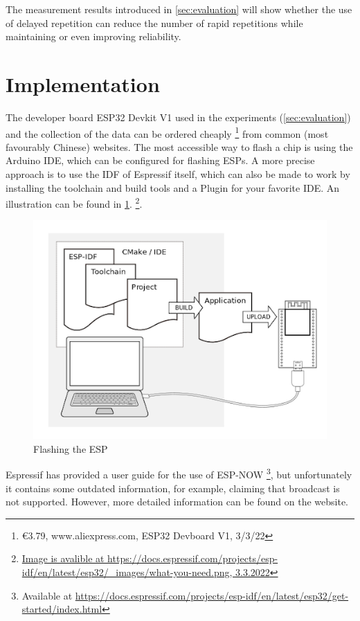 The measurement results introduced in \cref{sec:evaluation} will show whether the use of delayed repetition 
can reduce the number of rapid repetitions while maintaining or even improving reliability.

\section{Implementation}

The developer board ESP32 Devkit V1 used in the experiments (\cref{sec:evaluation}) 
and the collection of the data can be ordered cheaply 
\footnote{€3.79, www.aliexpress.com, ESP32 Devboard V1, 3/3/22}
from common (most favourably Chinese) websites. 
The most accessible way to flash a chip is using the Arduino IDE, which can be configured for flashing ESPs.
A more precise approach is to use the IDF of Espressif itself, 
which can also be made to work by installing the toolchain and build tools and a Plugin for your favorite IDE.
An illustration can be found in \cref{fig:ESP-IDF}.
\footnote{\url{Image is avalible at https://docs.espressif.com/projects/esp-idf/en/latest/esp32/_images/what-you-need.png, 3.3.2022}}.

\begin{figure}[h]
	\centering
	\includegraphics[scale=0.4]{figures/ESP-ISF.png}
	\caption{Flashing the ESP}
	\label{fig:ESP-IDF}
\end{figure}

Espressif has provided a user guide for the use of ESP-NOW 
\footnote{Available at \url{https://docs.espressif.com/projects/esp-idf/en/latest/esp32/get-started/index.html}},
but unfortunately it contains some outdated information, 
for example, claiming that broadcast is not supported.
However, more detailed information can be found on the website.

